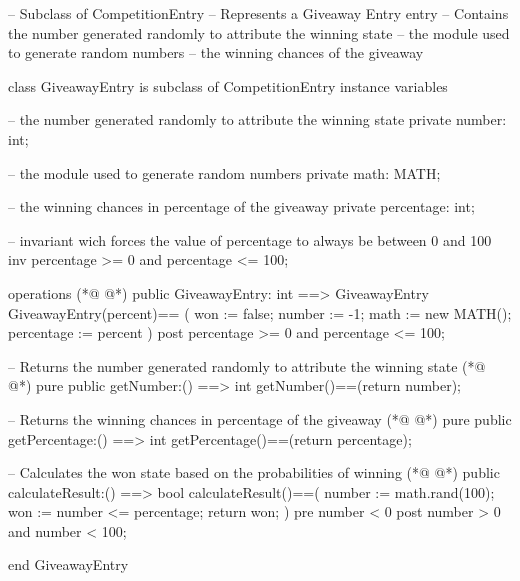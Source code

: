 \begin{vdmpp}[breaklines=true]
-- Subclass of CompetitionEntry
-- Represents a Giveaway Entry entry
-- Contains the number generated randomly to attribute the winning state
--      the module used to generate random numbers
--      the winning chances of the giveaway

class GiveawayEntry is subclass of CompetitionEntry
 instance variables
 
  -- the number generated randomly to attribute the winning state
    private number: int;
    
    -- the module used to generate random numbers
    private math: MATH;
    
    -- the winning chances in percentage of the giveaway
  private percentage: int;
  
  -- invariant wich forces the value of percentage to always be between 0 and 100
  inv percentage >= 0 and percentage <= 100;
  
operations
(*@
\label{GiveawayEntry:23}
@*)
  public GiveawayEntry: int  ==> GiveawayEntry
  GiveawayEntry(percent)== 
  (
    won := false;
    number := -1;
     math := new MATH();
     percentage := percent
  )
  post percentage >= 0 and percentage <= 100;
  
  -- Returns the number generated randomly to attribute the winning state
(*@
\label{getNumber:34}
@*)
  pure public getNumber:() ==> int
     getNumber()==(return number);
     
   -- Returns the winning chances in percentage of the giveaway
(*@
\label{getPercentage:38}
@*)
   pure public getPercentage:() ==> int
     getPercentage()==(return percentage);
     
   -- Calculates the won state based on the probabilities of winning  
(*@
\label{calculateResult:42}
@*)
   public calculateResult:() ==> bool
    calculateResult()==(
     number := math.rand(100);
      won := number <= percentage;
     return won;
    ) 
    pre number < 0
    post number > 0 and number < 100;
   
end GiveawayEntry
\end{vdmpp}
